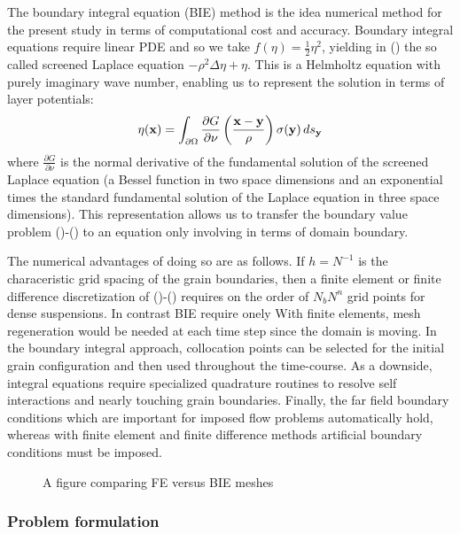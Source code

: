 The boundary integral equation (BIE) method is
the idea numerical method for the present study
in terms of computational cost and accuracy.
Boundary integral equations
require linear PDE and so we take $f(\eta) = \tfrac{1}{2}\eta^2$,
yielding in () the so called screened Laplace equation
$-\rho^2 \Delta \eta + \eta$.  This is a Helmholtz equation with purely imaginary
wave number, enabling us to represent the solution
in terms of layer potentials:
\begin{equation}
  \eta(\mathbf{x}) = \int_{\partial \Omega} \frac{\partial G}{\partial \nu}
  \left(\frac{\mathbf{x}-\mathbf{y}}{\rho}\right) \sigma(\mathbf{y}) \,ds_{\mathbf{y}}
\end{equation}
where $\frac{\partial G}{\partial \nu}$ is the normal derivative of the
fundamental solution of the screened Laplace equation
(a Bessel function in two space dimensions and
an exponential times the standard fundamental solution of the Laplace equation
in three space dimensions).
This representation allows us to transfer the boundary value problem ()-()
to an equation only involving in terms of domain boundary.  

The numerical advantages of doing so are as follows.  If $h = N^{-1}$
is the characeristic grid spacing of the grain boundaries, then a
finite element or finite difference discretization of ()-()
requires on the order of $N_b N^n$ grid points
for dense suspensions.  In contrast BIE require onely 
With finite elements, mesh regeneration
would be needed at each time step since the domain is moving.  
In the boundary integral approach, collocation points can be selected
for the initial grain configuration and then used throughout the
time-course.
As a downside, integral equations require specialized quadrature
routines to resolve self interactions and nearly touching
grain boundaries.  
Finally, the far field boundary conditions which are important for
imposed flow problems automatically hold, whereas with 
finite element and finite difference methods
artificial boundary conditions must be imposed.
\begin{figure}
A figure comparing FE versus BIE meshes
\end{figure}

\subsubsection{Problem formulation}


